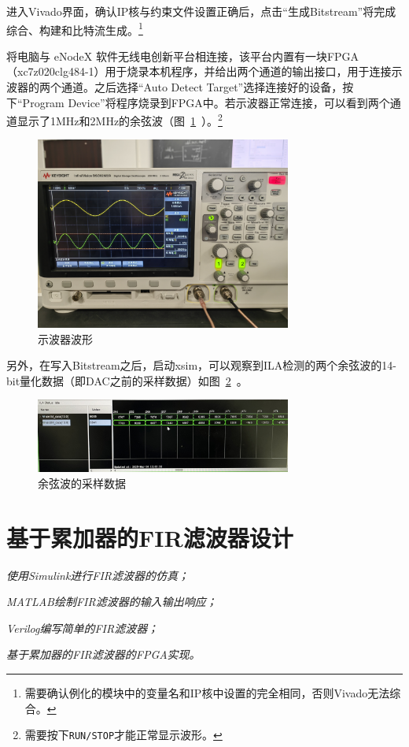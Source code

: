 \documentclass[lang=cn,newtx,10pt,scheme=chinese]{elegantbook}
\begin{document}
进入Vivado界面，确认IP核与约束文件设置正确后，点击“生成Bitstream”将完成综合、构建和比特流生成。\footnote{需要确认例化的模块中的变量名和IP核中设置的完全相同，否则Vivado无法综合。}

将电脑与 eNodeX 软件无线电创新平台相连接，该平台内置有一块FPGA（xc7z020clg484-1）用于烧录本机程序，并给出两个通道的输出接口，用于连接示波器的两个通道。之后选择“Auto Detect Target”选择连接好的设备，按下“Program Device”将程序烧录到FPGA中。若示波器正常连接，可以看到两个通道显示了1MHz和2MHz的余弦波（图~\ref{fig:exp3:waveform}~）。\footnote{需要按下\texttt{RUN/STOP}才能正常显示波形。}

\begin{figure}[htbp]
  \centering
  \includegraphics[width=0.75\textwidth]{figure/exp3/waveform.jpg}
  \caption{示波器波形}
  \label{fig:exp3:waveform}
\end{figure}

另外，在写入Bitstream之后，启动xsim，可以观察到ILA检测的两个余弦波的14-bit量化数据（即DAC之前的采样数据）如图~\ref{fig:exp3:sim}~。
\begin{figure}[htbp]
  \centering
  \includegraphics[width=0.75\textwidth]{figure/exp3/sim.png}
  \caption{余弦波的采样数据}
  \label{fig:exp3:sim}
\end{figure}


\chapter{基于累加器的FIR滤波器设计}
\begin{introduction}
  \item \textit{使用Simulink进行FIR滤波器的仿真；}
  \item \textit{MATLAB绘制FIR滤波器的输入输出响应；}
  \item \textit{Verilog编写简单的FIR滤波器；}
  \item \textit{基于累加器的FIR滤波器的FPGA实现。}
\end{introduction}
\end{document}
